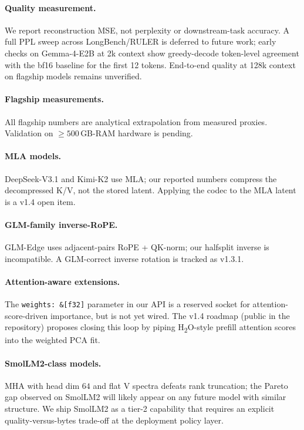 \documentclass[11pt,a4paper]{article}
\theoremstyle{definition}
\theoremstyle{plain}
\begin{document}
\paragraph{Quality measurement.} We report reconstruction MSE, not perplexity or downstream-task accuracy. A full PPL sweep across LongBench/RULER is deferred to future work; early checks on Gemma-4-E2B at 2k context show greedy-decode token-level agreement with the bf16 baseline for the first 12 tokens. End-to-end quality at 128k context on flagship models remains unverified.

\paragraph{Flagship measurements.} All flagship numbers are analytical extrapolation from measured proxies. Validation on $\geq 500$\,GB-RAM hardware is pending.

\paragraph{MLA models.} DeepSeek-V3.1 and Kimi-K2 use MLA; our reported numbers compress the decompressed K/V, not the stored latent. Applying the codec to the MLA latent is a v1.4 open item.

\paragraph{GLM-family inverse-RoPE.} GLM-Edge uses adjacent-pairs RoPE + QK-norm; our halfsplit inverse is incompatible. A GLM-correct inverse rotation is tracked as v1.3.1.

\paragraph{Attention-aware extensions.} The \texttt{weights: \&[f32]} parameter in our API is a reserved socket for attention-score-driven importance, but is not yet wired. The v1.4 roadmap (public in the repository) proposes closing this loop by piping H\textsubscript{2}O-style prefill attention scores into the weighted PCA fit.

\paragraph{SmolLM2-class models.} MHA with head dim $64$ and flat V spectra defeats rank truncation; the Pareto gap observed on SmolLM2 will likely appear on any future model with similar structure. We ship SmolLM2 as a tier-2 capability that requires an explicit quality-versus-bytes trade-off at the deployment policy layer.
\end{document}
